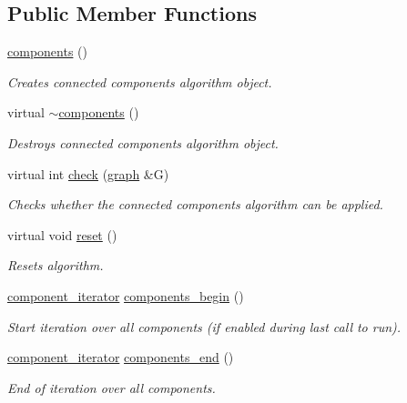 \subsection*{Public Member Functions}
\begin{DoxyCompactItemize}
\item 
\mbox{\hyperlink{classcomponents_af6a1be8a61478e8c8115cb66a40c9636}{components}} ()
\begin{DoxyCompactList}\small\item\em Creates connected components algorithm object. \end{DoxyCompactList}\item 
virtual \mbox{\hyperlink{classcomponents_aa38e55d08dd484dad3175617264056a5}{$\sim$components}} ()
\begin{DoxyCompactList}\small\item\em Destroys connected components algorithm object. \end{DoxyCompactList}\item 
virtual int \mbox{\hyperlink{classcomponents_aeeda901d02c65d6c31c8b6148540d7c1}{check}} (\mbox{\hyperlink{classgraph}{graph}} \&G)
\begin{DoxyCompactList}\small\item\em Checks whether the connected components algorithm can be applied. \end{DoxyCompactList}\item 
virtual void \mbox{\hyperlink{classcomponents_a07b6bab5962524ae26ccb478b35cd76c}{reset}} ()
\begin{DoxyCompactList}\small\item\em Resets algorithm. \end{DoxyCompactList}\item 
\mbox{\hyperlink{classcomponents_a0954ef13f83f3c1ac6cd4474cac17a36}{component\+\_\+iterator}} \mbox{\hyperlink{classcomponents_a8a645639044375cdaefabffda3ae70e0}{components\+\_\+begin}} ()
\begin{DoxyCompactList}\small\item\em Start iteration over all components (if enabled during last call to run). \end{DoxyCompactList}\item 
\mbox{\hyperlink{classcomponents_a0954ef13f83f3c1ac6cd4474cac17a36}{component\+\_\+iterator}} \mbox{\hyperlink{classcomponents_a8537c6e4c6a29a4ae05a937b5fda1fb9}{components\+\_\+end}} ()
\begin{DoxyCompactList}\small\item\em End of iteration over all components. \end{DoxyCompactList}\item 

\end{DoxyCompactItemize}
